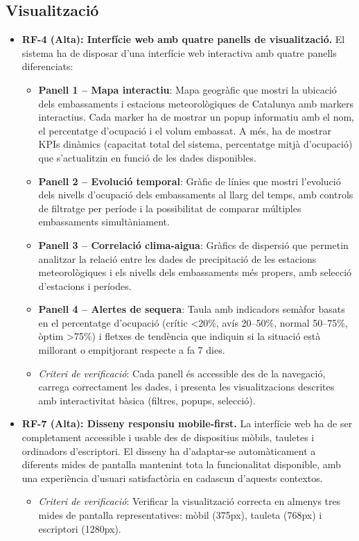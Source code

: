 \subsection{Visualització}

\begin{itemize}
    \item \textbf{RF-4 (Alta): Interfície web amb quatre panells de visualització.} El sistema ha de disposar d'una interfície web interactiva amb quatre panells diferenciats:
    \begin{itemize}
        \item \textbf{Panell 1 -- Mapa interactiu}: Mapa geogràfic que mostri la ubicació dels embassaments i estacions meteorològiques de Catalunya amb markers interactius. Cada marker ha de mostrar un popup informatiu amb el nom, el percentatge d'ocupació i el volum embassat. A més, ha de mostrar KPIs dinàmics (capacitat total del sistema, percentatge mitjà d'ocupació) que s'actualitzin en funció de les dades disponibles.
        \item \textbf{Panell 2 -- Evolució temporal}: Gràfic de línies que mostri l'evolució dels nivells d'ocupació dels embassaments al llarg del temps, amb controls de filtratge per període i la possibilitat de comparar múltiples embassaments simultàniament.
        \item \textbf{Panell 3 -- Correlació clima-aigua}: Gràfics de dispersió que permetin analitzar la relació entre les dades de precipitació de les estacions meteorològiques i els nivells dels embassaments més propers, amb selecció d'estacions i períodes.
        \item \textbf{Panell 4 -- Alertes de sequera}: Taula amb indicadors semàfor basats en el percentatge d'ocupació (crític \textless20\%, avís 20--50\%, normal 50--75\%, \`{o}ptim \textgreater75\%) i fletxes de tendència que indiquin si la situació està millorant o empitjorant respecte a fa 7 dies.
    \end{itemize}
    \begin{itemize}
        \item \textit{Criteri de verificació}: Cada panell és accessible des de la navegació, carrega correctament les dades, i presenta les visualitzacions descrites amb interactivitat bàsica (filtres, popups, selecció).
    \end{itemize}

    \item \textbf{RF-7 (Alta): Disseny responsiu mobile-first.} La interfície web ha de ser completament accessible i usable des de dispositius mòbils, tauletes i ordinadors d'escriptori. El disseny ha d'adaptar-se automàticament a diferents mides de pantalla mantenint tota la funcionalitat disponible, amb una experiència d'usuari satisfactòria en cadascun d'aquests contextos.
    \begin{itemize}
        \item \textit{Criteri de verificació}: Verificar la visualització correcta en almenys tres mides de pantalla representatives: mòbil (375px), tauleta (768px) i escriptori (1280px).
    \end{itemize}


\end{itemize}
